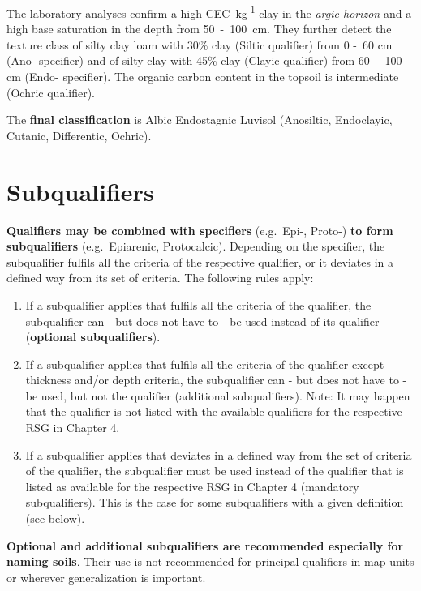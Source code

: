 \documentclass[
  letterpaper,
  DIV=11,
  numbers=noendperiod]{scrreprt}
\providecommand{\tightlist}{%
  \setlength{\itemsep}{0pt}\setlength{\parskip}{0pt}}\usepackage{longtable,booktabs,array}
\begin{document}
The laboratory analyses confirm a high CEC~kg\textsuperscript{-1} clay
in the \emph{argic horizon} and a high base saturation in the depth from
50~-~100~cm. They further detect the texture class of silty clay loam
with 30\% clay (Siltic qualifier) from 0 -~60 cm (Ano- specifier) and of
silty clay with 45\% clay (Clayic qualifier) from 60~-~100 cm (Endo-
specifier). The organic carbon content in the topsoil is intermediate
(Ochric qualifier).

The \textbf{final classification} is Albic Endostagnic Luvisol
(Anosiltic, Endoclayic, Cutanic, Differentic, Ochric).

\hypertarget{subqualifiers}{%
\section{Subqualifiers}\label{subqualifiers}}

\textbf{Qualifiers may be combined with specifiers} (e.g.~Epi-, Proto-)
\textbf{to form subqualifiers} (e.g.~Epiarenic, Protocalcic). Depending
on the specifier, the subqualifier fulfils all the criteria of the
respective qualifier, or it deviates in a defined way from its set of
criteria. The following rules apply:

\begin{enumerate}
\def\labelenumi{\arabic{enumi}.}
\tightlist
\item
  If a subqualifier applies that fulfils all the criteria of the
  qualifier, the subqualifier can - but does not have to - be used
  instead of its qualifier (\textbf{optional subqualifiers}).
\item
  If a subqualifier applies that fulfils all the criteria of the
  qualifier except thickness and/or depth criteria, the subqualifier can
  - but does not have to - be used, but not the qualifier (additional
  subqualifiers). Note: It may happen that the qualifier is not listed
  with the available qualifiers for the respective RSG in Chapter 4.
\item
  If a subqualifier applies that deviates in a defined way from the set
  of criteria of the qualifier, the subqualifier must be used instead of
  the qualifier that is listed as available for the respective RSG in
  Chapter 4 (mandatory subqualifiers). This is the case for some
  subqualifiers with a given definition (see below).
\end{enumerate}

\textbf{Optional and additional subqualifiers are recommended especially
for naming soils}. Their use is not recommended for principal qualifiers
in map units or wherever generalization is important.
\end{document}
